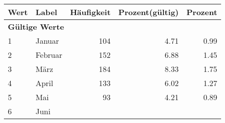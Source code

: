      \begin{longtable}{lXrrr}
     \toprule
     \textbf{Wert} & \textbf{Label} & \textbf{Häufigkeit} & \textbf{Prozent(gültig)} & \textbf{Prozent} \\
     \endhead
     \midrule
     \multicolumn{5}{l}{\textbf{Gültige Werte}}\\

     1 &
     \multicolumn{1}{X}{ Januar   } &


       \num{104} &
       \num[round-mode=places,round-precision=2]{4,71} &
         \num[round-mode=places,round-precision=2]{0,99} \\

     2 &
     \multicolumn{1}{X}{ Februar   } &


       \num{152} &
       \num[round-mode=places,round-precision=2]{6,88} &
         \num[round-mode=places,round-precision=2]{1,45} \\

     3 &
     \multicolumn{1}{X}{ März   } &


       \num{184} &
       \num[round-mode=places,round-precision=2]{8,33} &
         \num[round-mode=places,round-precision=2]{1,75} \\

     4 &
     \multicolumn{1}{X}{ April   } &


       \num{133} &
       \num[round-mode=places,round-precision=2]{6,02} &
         \num[round-mode=places,round-precision=2]{1,27} \\

     5 &
     \multicolumn{1}{X}{ Mai   } &


       \num{93} &
       \num[round-mode=places,round-precision=2]{4,21} &
         \num[round-mode=places,round-precision=2]{0,89} \\

     6 &
     \multicolumn{1}{X}{ Juni   } &



\end{longtable}
